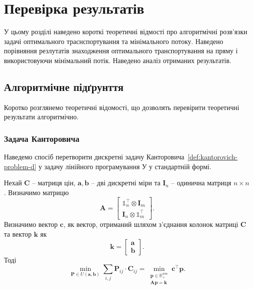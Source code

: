 \chapter{Перевірка результатів}
\label{chap:experiment}

У цьому розділі наведено короткі теоретичні відмості про алгоритмічні розв'язки задачі оптимального траснспортування та 
мінімального потоку. Наведено порівняння резлутатів знаходження оптимального транспортування на пряму і використовуючи мінімальний
потік. Наведено аналіз отриманих результатів.

\section{Алгоритмічне підґрунття}
Коротко розглянемо теоретичні відомості, що дозволять перевірити теоретичні результати алгоритмічно.

\subsection{Задача Канторовича}
Наведемо спосіб перетворити дискретні задачу Канторовича~\ref{def:kantorovich-problem-d} у задачу лінійного програмування У
у стандартній формі.

\begin{claim}
    Нехай $\mathbf{C}$ -- матриця цін, $\mathbf{a}, \mathbf{b}$ -- дві дискретні міри
    та $\mathbf{I}_n$ -- одинична матриця $n \times n$. Визначимо матрицю
    $$
    \mathbf{A} = 
    \begin{bmatrix}
    \mathbb{1}_n^\top \otimes \mathbf{I}_m \\
    \mathbf{I}_n \otimes \mathbb{1}_m^\top
    \end{bmatrix}.
    $$
    Визначимо вектор $\mathbf{c}$, як вектор, отриманий шляхом з'єднання колонок матриці $\mathbf{C}$ та вектор $\mathbf{k}$ як
    $$ \mathbf{k} =
        \begin{bmatrix}
            \mathbf{a} \\
            \mathbf{b}
        \end{bmatrix}.
    $$
    Тоді
    \begin{equation}
        \label{eq:kantorovich-linear}
        \min_{\mathbf{P} \in U\left(\mathbf{a}, \mathbf{b}\right)} \sum_{i,j} \mathbf{P}_{ij} \cdot \mathbf{C}_{ij} =
        \min_{\substack{
            \mathbf{p} \in \mathbb{R}_+^{nm} \\
            \mathbf{A}\mathbf{p} = \mathbf{k}
        }}
        \mathbf{c}^\top \mathbf{p}.
    \end{equation}
\end{claim}

